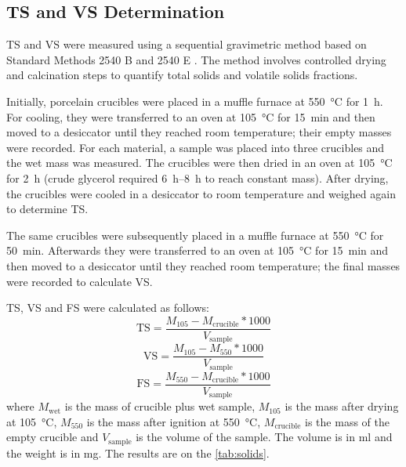 \subsection{TS and VS Determination}
\label{subsec:ts_vs_determination}

TS and VS were measured using a sequential gravimetric method based on Standard Methods 2540 B and 2540 E \parencite{apha2017}. The method involves controlled drying and calcination steps to quantify total solids and volatile solids fractions.

Initially, porcelain crucibles were placed in a muffle furnace at \qty{550}{\celsius} for \qty{1}{\hour}. For cooling, they were transferred to an oven at \qty{105}{\celsius} for \qty{15}{\minute} and then moved to a desiccator until they reached room temperature; their empty masses were recorded. For each material, a sample was placed into three crucibles and the wet mass was measured. The crucibles were then dried in an oven at \qty{105}{\celsius} for \qty{2}{\hour} (crude glycerol required \qtyrange{6}{8}{\hour} to reach constant mass). After drying, the crucibles were cooled in a desiccator to room temperature and weighed again to determine TS.

The same crucibles were subsequently placed in a muffle furnace at \qty{550}{\celsius} for \qty{50}{\minute}. Afterwards they were transferred to an oven at \qty{105}{\celsius} for \qty{15}{\minute} and then moved to a desiccator until they reached room temperature; the final masses were recorded to calculate VS.

TS, VS and FS were calculated as follows:
\begin{equation}
    \text{TS} = \frac{M_{105} - M_{\text{crucible}} * 1000}{V_{\text{sample}}}
    \label{eq:TS}
\end{equation}
\begin{equation}
    \text{VS} = \frac{M_{105} - M_{550} * 1000}{V_{\text{sample}}}
    \label{eq:VS}
\end{equation}
\begin{equation}
    \text{FS} = \frac{M_{550} - M_{\text{crucible}} * 1000}{V_{\text{sample}}}
    \label{eq:FS}
\end{equation}
where $M_{\text{wet}}$ is the mass of crucible plus wet sample, $M_{105}$ is the mass after drying at \qty{105}{\celsius}, $M_{550}$ is the mass after ignition at \qty{550}{\celsius}, $M_{\text{crucible}}$ is the mass of the empty crucible and $V_{\text{sample}}$ is the volume of the sample. The volume is in \unit{\milli\litre} and the weight is in \unit{\milli\gram}. The results are on the \cref{tab:solids}.

